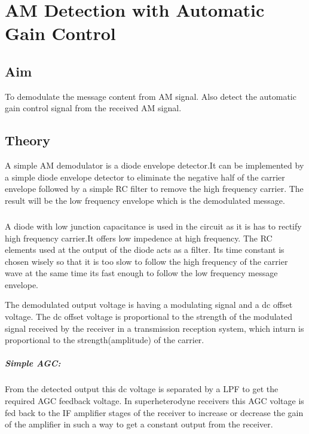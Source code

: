 \chapter[AM Detection with Automatic Gain Control]{AM Detection with Automatic Gain Control}
\section*{Aim}
To demodulate the message content from AM signal. Also detect the automatic gain control signal from the received AM signal.
\section*{Theory}


A simple AM demodulator is a diode envelope detector.It can be implemented by a simple diode envelope detector to eliminate the negative half of the carrier envelope followed by a simple RC filter to remove the high frequency carrier. The result will be the low frequency envelope which is the demodulated message.

\paragraph{}
A diode with low junction capacitance is used in the circuit as it is has to rectify high frequency carrier.It offers low impedence at high frequency. The RC elements used at the output of the diode acts as a filter. Its time constant is chosen wisely so that it is too slow to follow the high frequency of the carrier wave at the same time its fast enough to follow the low frequency message envelope. 

The demodulated output voltage is having a modulating signal and a dc offset voltage. The dc offset voltage is proportional to the strength of the modulated signal received by the receiver in a transmission reception system, which inturn is proportional to the strength(amplitude) of the carrier.

\paragraph{Simple AGC:} From the detected output this dc voltage is separated by a LPF to get the required AGC feedback voltage. In superheterodyne receivers this AGC voltage is fed back to the IF amplifier stages of the receiver to increase or decrease the gain of the amplifier in such a way to get a constant output from the receiver.


